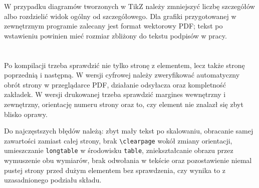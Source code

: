 W przypadku diagramów tworzonych w TikZ należy zmniejszyć liczbę szczegółów albo rozdzielić widok ogólny od szczegółowego. Dla grafiki przygotowanej w zewnętrznym programie zalecany jest format wektorowy PDF; tekst po wstawieniu powinien mieć rozmiar zbliżony do tekstu podpisów w pracy.

\section{}

Po kompilacji trzeba sprawdzić nie tylko stronę z elementem, lecz także stronę poprzednią i następną. W wersji cyfrowej należy zweryfikować automatyczny obrót strony w przeglądarce PDF, działanie odsyłacza oraz kompletność zakładek. W wersji drukowanej trzeba sprawdzić margines wewnętrzny i zewnętrzny, orientację numeru strony oraz to, czy element nie znalazł się zbyt blisko oprawy.

Do najczęstszych błędów należą: zbyt mały tekst po skalowaniu, obracanie samej zawartości zamiast całej strony, brak \verb|\clearpage| wokół zmiany orientacji, umieszczanie \texttt{longtable} w środowisku \texttt{table}, zniekształcanie obrazu przez wymuszenie obu wymiarów, brak odwołania w tekście oraz pozostawienie niemal pustej strony przed dużym elementem bez sprawdzenia, czy wynika to z uzasadnionego podziału składu.
